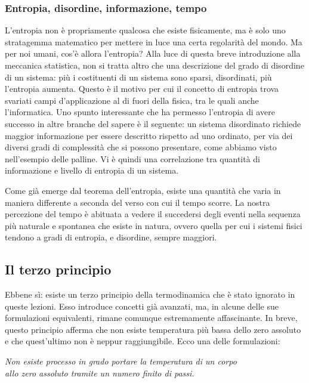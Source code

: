 \subsubsection*{Entropia, disordine, informazione, tempo}
L'entropia non è propriamente qualcosa che esiste fisicamente,
ma è solo uno stratagemma matematico per mettere in luce una
certa regolarità del mondo.
Ma per noi umani, cos'è allora l'entropia? Alla luce di questa breve introduzione
alla meccanica statistica, non si tratta altro che una descrizione
del grado di disordine di un sistema: più i costituenti di un
sistema sono sparsi, disordinati, più l'entropia aumenta. Questo
è il motivo per cui il concetto di entropia trova svariati campi
d'applicazione al di fuori della fisica, tra le quali anche
l'informatica. Uno spunto interessante che ha permesso l'entropia
di avere successo in altre branche del sapere è il seguente: un
sistema disordinato richiede maggior informazione per essere
descritto rispetto ad uno ordinato, per via dei diversi gradi
di complessità che si possono presentare, come abbiamo visto
nell'esempio delle palline. Vi è quindi una correlazione tra
quantità di informazione e livello di entropia di un sistema.

Come già emerge dal teorema dell'entropia, esiste una quantità
che varia in maniera differente a seconda del verso con cui il
tempo scorre. La nostra percezione del tempo è abituata a vedere
il succedersi degli eventi nella sequenza più naturale e spontanea
che esiste in natura, ovvero quella per cui i sistemi fisici tendono
a gradi di entropia, e disordine, sempre maggiori.

\subsection{Il terzo principio}
Ebbene sì: esiste un terzo principio della termodinamica che è stato
ignorato in queste lezioni. Esso introduce concetti già avanzati, ma,
in alcune delle sue formulazioni equivalenti, rimane comunque estremamente
affascinante. In breve, questo principio afferma che non esiste
temperatura più bassa dello zero assoluto e che quest'ultimo non è
neppur raggiungibile. Ecco una delle formulazioni:

\begin{center}
    \textit{Non esiste processo in grado portare la temperatura di un corpo\\allo
    zero assoluto tramite un numero finito di passi.}
\end{center}


